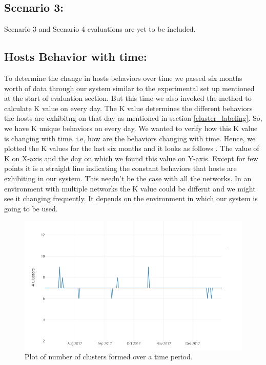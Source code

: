 \subsection{Scenario 3:}
Scenario 3 and Scenario 4 evaluations are yet to be included.

\subsection{Hosts Behavior with time:}

To determine the change in hosts behaviors over time we passed six months worth of data through our system similar to the experimental set up mentioned at the start of evaluation section. But this time we also invoked the method to calculate K value on every day. The K value determines the different behaviors the hosts are exhibitng on that day as mentioned in section \ref{cluster_labeling}. So, we have K unique behaviors on every day. We wanted to verify how this K value is changing with time. i.e, how are the behaviors changing with time. Hence, we plotted the K values for the last six months and it looks as follows . The value of K on X-axis and the day on which we found this value on Y-axis. Except for few points it is a straight line indicating the constant behaviors that hosts are exhibiting in our system. This needn't be the case with all the networks. In an environment with multiple networks the K value could be differnt and we might see it changing frequently. It depends on the environment in which our system is going to be used.

\begin{figure}[b]
	\centerline{\includegraphics{constant.png}}
	\caption{ Plot of number of clusters formed over a time period.}%
\end{figure}